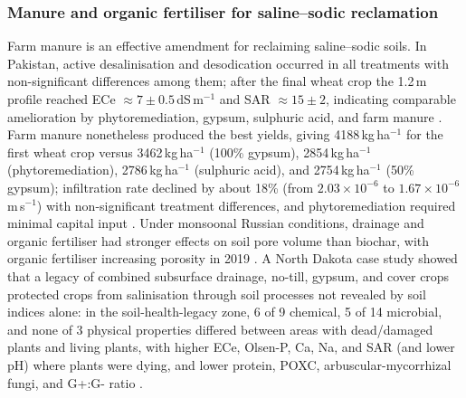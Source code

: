 \documentclass[11pt]{article}
\begin{document}
\subsubsection{Manure and organic fertiliser for saline--sodic reclamation}
Farm manure is an effective amendment for reclaiming saline--sodic soils. In Pakistan, active desalinisation and desodication occurred in all treatments with non-significant differences among them; after the final wheat crop the 1.2\,m profile reached ECe $\approx 7\pm0.5$\,dS\,m$^{-1}$ and SAR $\approx 15\pm2$, indicating comparable amelioration by phytoremediation, gypsum, sulphuric acid, and farm manure \parencite{Qadir2001}. Farm manure nonetheless produced the best yields, giving 4188\,kg\,ha$^{-1}$ for the first wheat crop versus 3462\,kg\,ha$^{-1}$ (100\% gypsum), 2854\,kg\,ha$^{-1}$ (phytoremediation), 2786\,kg\,ha$^{-1}$ (sulphuric acid), and 2754\,kg\,ha$^{-1}$ (50\% gypsum); infiltration rate declined by about 18\% (from $2.03\times10^{-6}$ to $1.67\times10^{-6}$\,m\,s$^{-1}$) with non-significant treatment differences, and phytoremediation required minimal capital input \parencite{Qadir2001}. Under monsoonal Russian conditions, drainage and organic fertiliser had stronger effects on soil pore volume than biochar, with organic fertiliser increasing porosity in 2019 \parencite{Brikmans2025}. A North Dakota case study showed that a legacy of combined subsurface drainage, no-till, gypsum, and cover crops protected crops from salinisation through soil processes not revealed by soil indices alone: in the soil-health-legacy zone, 6 of 9 chemical, 5 of 14 microbial, and none of 3 physical properties differed between areas with dead/damaged plants and living plants, with higher ECe, Olsen-P, Ca, Na, and SAR (and lower pH) where plants were dying, and lower protein, POXC, arbuscular-mycorrhizal fungi, and G+:G- ratio \parencite{Daigh2025}.
\end{document}
